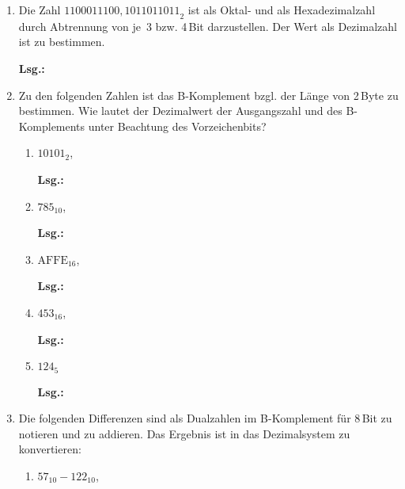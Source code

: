 \documentclass[12pt,a4paper]{scrreprt}
\newcommand{\Lsg}{\par \textbf{Lsg.: }}
\newcommand{\Byte}{\,Byte}
\newcommand{\Bit}{\,Bit}
\begin{document}
\begin{enumerate}
\begin{enumerate}
\item ${0,371}_8$,
\item $\text{0,FFFF}_{16}$,
\item ${0,110011}_2$,
\item $\text{ABD,DE}_{16}$
\end{enumerate}

\Lsg%

\item Die Zahl ${1100011100,1011011011}_2$ ist als Oktal- und als Hexadezimalzahl durch Abtrennung von je~3 bzw. \si{4}{\Bit} darzustellen. Der Wert als Dezimalzahl ist zu bestimmen.

\Lsg%

\item Zu den folgenden Zahlen ist das B-Komplement bzgl. der Länge von \si{2}{\Byte} zu bestimmen. Wie lautet der Dezimalwert der Ausgangszahl
und des B-Komplements unter Beachtung des Vorzeichenbits?

\begin{enumerate}
\item $10101_2$,

\Lsg%

\item $785_{10}$,

\Lsg%

\item $\text{AFFE}_{16}$,

\Lsg%

\item $453_{16}$,

\Lsg%

\item $124_{5}$

\Lsg%

\end{enumerate}

\item Die folgenden Differenzen sind als Dualzahlen im B-Komplement für \si{8}{\Bit} zu notieren und zu addieren. Das Ergebnis ist in das Dezimalsystem zu konvertieren:

\begin{enumerate}
\item $57_{10} - 122_{10}$,


\end{enumerate}
\end{enumerate}
\end{document}
